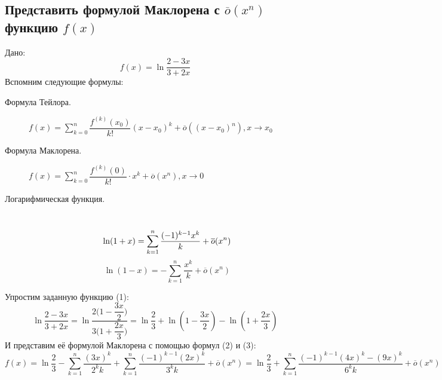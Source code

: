 \documentclass{article}
\newcommand{\mysection}[3]{\setcounter{section}{#1}\setcounter{subsection}{#2}\addtocounter{subsection}{-1}\subsection{#3}}
\begin{document}
\clearpage
\mysection{4}{4}{Представить формулой Маклорена с $\overline{o}(x^n)$ функцию $f(x)$}
Дано:
\begin{equation}
f(x)=\ln{\dfrac{2-3x}{3+2x}}
\end{equation}
Вспомним следующие формулы:
\begin{description}
    \item[Формула Тейлора.] $f(x) = \displaystyle\sum_{k=0}^{n}{\dfrac{f^{(k)}(x_0)}{k!}(x-x_0)^k} + \overline{o}((x-x_0)^n), x \to x_0$
    \item[Формула Маклорена.] $f(x) = \displaystyle\sum_{k=0}^{n}{\dfrac{f^(k)(0)}{k!} \cdot x^k} + \overline{o}(x^n), x \to 0$
    \item[Логарифмическая функция.] \, \\
        \begin{equation}
            \ln(1+x) = \displaystyle\sum_{k=1}^n \dfrac{(-1)^{k-1}x^k}{k} + \overline{o}(x^n) \\
        \end{equation}
        \begin{equation}
            \ln(1-x) = -\displaystyle\sum_{k=1}^n \dfrac{x^k}{k} + \overline{o}(x^n)
        \end{equation}
\end{description}
Упростим заданную функцию (1):
\begin{equation*}
    \ln{\dfrac{2-3x}{3+2x}} = \ln{\dfrac{2\Bigg(1-\dfrac{3x}{2}\Bigg)}{3\Bigg(1+\dfrac{2x}{3}\Bigg)}} = \ln\dfrac{2}{3} + \ln(1-\dfrac{3x}{2}) - \ln(1+\dfrac{2x}{3})
\end{equation*}
И представим её формулой Маклорена с помощью формул (2) и (3): \\
\begin{equation*}
    f(x) = \ln{\dfrac{2}{3}} - \displaystyle\sum_{k=1}^n \dfrac{(3x)^k}{2^k k} + \displaystyle\sum_{k=1}^n \dfrac{(-1)^{k-1}(2x)^k}{3^k k} + \overline{o}(x^n) =
    \ln{\dfrac{2}{3}} + \displaystyle\sum_{k=1}^n \dfrac{(-1)^{k-1}(4x)^k - (9x)^k}{6^k k} + \overline{o}(x^n)
\end{equation*}
\end{document}
